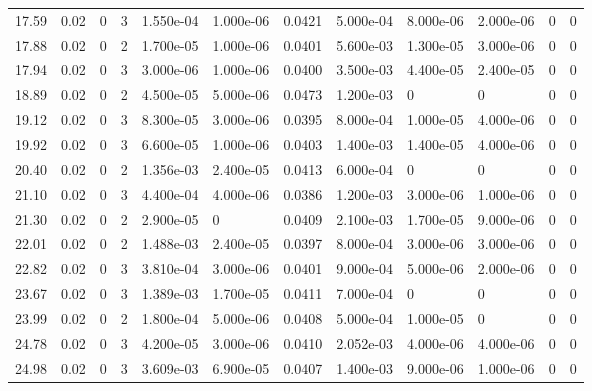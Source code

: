 \documentclass[preview]{standalone}
\begin{document}
{{\begin{tabular}{L{1.2cm}C{1.2cm} C{0.3cm}C{0.5cm} C{1.4cm}C{1.4cm} C{1.4cm}C{1.4cm} C{1.6cm}C{1.6cm} C{1.6cm}C{1.6cm}}
  17.59  &  0.02  & 0     &  3 &  1.550e-04  & 1.000e-06  &  0.0421&   5.000e-04& 8.000e-06 & 2.000e-06   &  0 & 0  \\ 
  17.88  &  0.02  & 0     &  2 &  1.700e-05  & 1.000e-06  &  0.0401&   5.600e-03& 1.300e-05 & 3.000e-06   &  0 & 0  \\ 
  17.94  &  0.02  & 0     &  3 &  3.000e-06  & 1.000e-06  &  0.0400&   3.500e-03& 4.400e-05 & 2.400e-05   &  0 & 0  \\ 
  18.89  &  0.02  & 0     &  2 &  4.500e-05  & 5.000e-06  &  0.0473&   1.200e-03& 0 & 0   &  0 & 0  \\ 
  19.12  &  0.02  & 0     &  3 &  8.300e-05  & 3.000e-06  &  0.0395&   8.000e-04& 1.000e-05 & 4.000e-06   &  0 & 0  \\ 
  19.92  &  0.02  & 0     &  3 &  6.600e-05  & 1.000e-06  &  0.0403&   1.400e-03& 1.400e-05 & 4.000e-06   &  0 & 0  \\ 
  20.40  &  0.02  & 0     &  2 &  1.356e-03  & 2.400e-05  &  0.0413&   6.000e-04& 0 & 0   &  0 & 0  \\ 
  21.10  &  0.02  & 0     &  3 &  4.400e-04  & 4.000e-06  &  0.0386&   1.200e-03& 3.000e-06 & 1.000e-06   &  0 & 0  \\ 
  21.30  &  0.02  & 0     &  2 &  2.900e-05  & 0  &  0.0409&   2.100e-03& 1.700e-05 & 9.000e-06   &  0 & 0  \\ 
  22.01  &  0.02  & 0     &  2 &  1.488e-03  & 2.400e-05  &  0.0397&   8.000e-04& 3.000e-06 & 3.000e-06   &  0 & 0  \\ 
  22.82  &  0.02  & 0     &  3 &  3.810e-04  & 3.000e-06  &  0.0401&   9.000e-04& 5.000e-06 & 2.000e-06   &  0 & 0  \\ 
  23.67  &  0.02  & 0     &  3 &  1.389e-03  & 1.700e-05  &  0.0411&   7.000e-04& 0 & 0   &  0 & 0  \\ 
  23.99  &  0.02  & 0     &  2 &  1.800e-04  & 5.000e-06  &  0.0408&   5.000e-04& 1.000e-05 & 0   &  0 & 0  \\ 
  24.78  &  0.02  & 0     &  3 &  4.200e-05  & 3.000e-06  &  0.0410&   2.052e-03& 4.000e-06 & 4.000e-06   &  0 & 0  \\ 
  24.98  &  0.02  & 0     &  3 &  3.609e-03  & 6.900e-05  &  0.0407&   1.400e-03& 9.000e-06 & 1.000e-06   &  0 & 0  \\ 
\hline 
\end{tabular} 

}}
\end{document}
